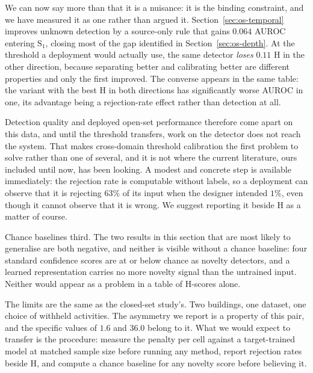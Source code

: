 We can now say more than that it is a nuisance: it is the binding constraint, and we have
measured it as one rather than argued it. Section~\ref{sec:os-temporal} improves unknown
detection by a source-only rule that gains $0.064$ AUROC entering $\text{S}_1$, closing
most of the gap identified in Section~\ref{sec:os-depth}. At the threshold a deployment
would actually use, the same detector \emph{loses} $0.11$ H in the other direction,
because separating better and calibrating better are different properties and only the
first improved. The converse appears in the same table: the variant with the best H in
both directions has significantly worse AUROC in one, its advantage being a rejection-rate
effect rather than detection at all.

Detection quality and deployed open-set performance therefore come apart on this data, and
until the threshold transfers, work on the detector does not reach the system. That makes
cross-domain threshold calibration the first problem to solve rather than one of several,
and it is not where the current literature, ours included until now, has been looking. A
modest and concrete step is available immediately: the rejection rate is computable without
labels, so a deployment can observe that it is rejecting $63\%$ of its input when the
designer intended $1\%$, even though it cannot observe that it is wrong. We suggest
reporting it beside H as a matter of course.

Chance baselines third. The two results in this section that are most likely to generalise
are both negative, and neither is visible without a chance baseline: four standard
confidence scores are at or below chance as novelty detectors, and a learned representation
carries no more novelty signal than the untrained input. Neither would appear as a problem
in a table of H-scores alone.

The limits are the same as the closed-set study's. Two buildings, one dataset, one choice
of withheld activities. The asymmetry we report is a property of this pair, and the
specific values of $1.6$ and $36.0$ belong to it. What we would expect to transfer is the
procedure: measure the penalty per cell against a target-trained model at matched sample
size before running any method, report rejection rates beside H, and compute a chance
baseline for any novelty score before believing it.
